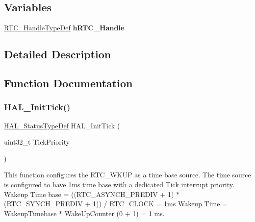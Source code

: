 \subsection*{Variables}
\begin{DoxyCompactItemize}
\item 
\mbox{\label{group___h_a_l___time_base___r_t_c___wake_up___template_ga66edbb38f0b45759c28ecd5aede14478}} 
\hyperlink{struct_r_t_c___handle_type_def}{R\+T\+C\+\_\+\+Handle\+Type\+Def} {\bfseries h\+R\+T\+C\+\_\+\+Handle}
\end{DoxyCompactItemize}


\subsection{Detailed Description}


\subsection{Function Documentation}
\mbox{\label{group___h_a_l___time_base___r_t_c___wake_up___template_ga879cdb21ef051eb81ec51c18147397d5}} 
\subsubsection{\texorpdfstring{H\+A\+L\+\_\+\+Init\+Tick()}{HAL\_InitTick()}}
{\footnotesize\ttfamily \hyperlink{stm32f0xx__hal__def_8h_a63c0679d1cb8b8c684fbb0632743478f}{H\+A\+L\+\_\+\+Status\+Type\+Def} H\+A\+L\+\_\+\+Init\+Tick (\begin{DoxyParamCaption}\item[{uint32\+\_\+t}]{Tick\+Priority }\end{DoxyParamCaption})}



This function configures the R\+T\+C\+\_\+\+W\+K\+UP as a time base source. The time source is configured to have 1ms time base with a dedicated Tick interrupt priority. Wakeup Time base = ((R\+T\+C\+\_\+\+A\+S\+Y\+N\+C\+H\+\_\+\+P\+R\+E\+D\+IV + 1) $\ast$ (R\+T\+C\+\_\+\+S\+Y\+N\+C\+H\+\_\+\+P\+R\+E\+D\+IV + 1)) / R\+T\+C\+\_\+\+C\+L\+O\+CK = 1ms Wakeup Time = Wakeup\+Timebase $\ast$ Wake\+Up\+Counter (0 + 1) = 1 ms. 

